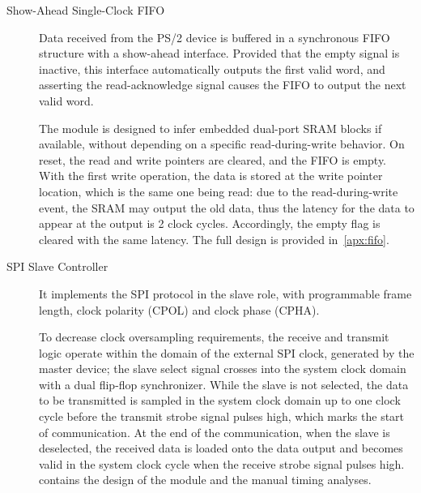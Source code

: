 \documentclass[]{article}
\begin{document}
\begin{description}
    \item[Show-Ahead Single-Clock FIFO] Data received from the PS/2 device is buffered in a synchronous FIFO structure with a show-ahead interface. Provided that the empty signal is inactive, this interface automatically outputs the first valid word, and asserting the read-acknowledge signal causes the FIFO to output the next valid word.

    The module is designed to infer embedded dual-port SRAM blocks if available, without depending on a specific read-during-write behavior. On reset, the read and write pointers are cleared, and the FIFO is empty. With the first write operation, the data is stored at the write pointer location, which is the same one being read: due to the read-during-write event, the SRAM may output the old data, thus the latency for the data to appear at the output is 2 clock cycles. Accordingly, the empty flag is cleared with the same latency. The full design is provided in~\cref{apx:fifo}.

    \item[SPI Slave Controller] It implements the SPI protocol in the slave role, with programmable frame length, clock polarity (CPOL) and clock phase (CPHA).

    To decrease clock oversampling requirements, the receive and transmit logic operate within the domain of the external SPI clock, generated by the master device; the slave select signal crosses into the system clock domain with a dual flip-flop synchronizer. While the slave is not selected, the data to be transmitted is sampled in the system clock domain up to one clock cycle before the transmit strobe signal pulses high, which marks the start of communication. At the end of the communication, when the slave is deselected, the received data is loaded onto the data output and becomes valid in the system clock cycle when the receive strobe signal pulses high.
     contains the design of the module and the manual timing analyses.
    
\end{description}
\end{document}
